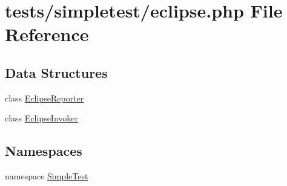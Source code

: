 \hypertarget{eclipse_8php}{\section{tests/simpletest/eclipse.php File Reference}
\label{eclipse_8php}
}
\subsection*{Data Structures}
\begin{DoxyCompactItemize}
\item 
class \hyperlink{class_eclipse_reporter}{Eclipse\-Reporter}
\item 
class \hyperlink{class_eclipse_invoker}{Eclipse\-Invoker}
\end{DoxyCompactItemize}
\subsection*{Namespaces}
\begin{DoxyCompactItemize}
\item 
namespace \hyperlink{namespace_simple_test}{Simple\-Test}
\end{DoxyCompactItemize}
